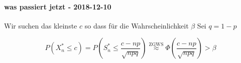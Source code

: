 \par
\bigskip

\paragraph{was passiert jetzt - 2018-12-10}

Wir suchen das kleinste $c$ so dass für die Wahrscheinlichkeit $\beta$ Sei $q=1-p$


\begin{equation*}
	P(X_n^\ast\leq c) =P\left(S_n^\ast\leq \frac{c-np}{\sqrt{npq}}\right)\overset{\text{ZGWS}}\approx\Phi\left( \frac{c-np}{\sqrt{npq}}\right)>\beta
\end{equation*}



